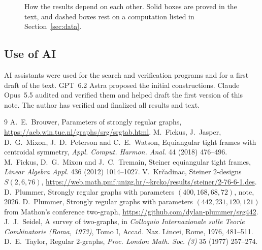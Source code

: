 \documentclass[11pt]{amsart}
\theoremstyle{remark}
\begin{document}
\begin{figure}[t]
\centering
\resizebox{\textwidth}{!}{}
\caption{How the results depend on each other. Solid boxes are proved in the text, and dashed boxes rest on a computation listed in Section~\ref{sec:data}.}
\label{fig:flow}
\end{figure}

\subsection*{Use of AI}
AI assistants were used for the search and verification programs and for a first draft of the text. GPT~6.2 Astra proposed the initial constructions. Claude Opus~5.5 audited and verified them and helped draft the first version of this note. The author has verified and finalized all results and text.

\begin{thebibliography}{9}
 A.~E.~Brouwer, Parameters of strongly regular graphs, \url{https://aeb.win.tue.nl/graphs/srg/srgtab.html}.
 M.~Fickus, J.~Jasper, D.~G.~Mixon, J.~D.~Peterson and C.~E.~Watson, Equiangular tight frames with centroidal symmetry, \emph{Appl. Comput. Harmon. Anal.} 44 (2018) 476--496.
 M.~Fickus, D.~G.~Mixon and J.~C.~Tremain, Steiner equiangular tight frames, \emph{Linear Algebra Appl.} 436 (2012) 1014--1027.
 V.~Kr\v{c}adinac, Steiner $2$-designs $S(2,6,76)$, \url{https://web.math.pmf.unizg.hr/~krcko/results/steiner/2-76-6-1.des}.
 D.~Plummer, Strongly regular graphs with parameters $(400,168,68,72)$, note, 2026.
 D.~Plummer, Strongly regular graphs with parameters $(442,231,120,121)$ from Mathon's conference two-graph, \url{https://github.com/dylan-plummer/srg442}.
 J.~J.~Seidel, A survey of two-graphs, in \emph{Colloquio Internazionale sulle Teorie Combinatorie (Roma, 1973)}, Tomo I, Accad. Naz. Lincei, Rome, 1976, 481--511.
 D.~E.~Taylor, Regular $2$-graphs, \emph{Proc. London Math. Soc. (3)} 35 (1977) 257--274.
\end{thebibliography}
\end{document}
